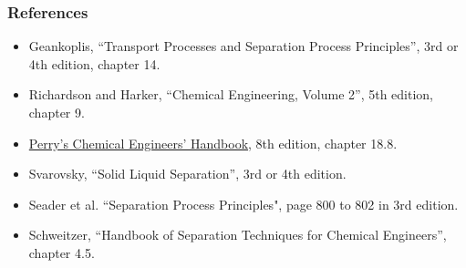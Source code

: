 




\begin{frame}\frametitle{References}
	\begin{itemize}
		\item	Geankoplis, ``Transport Processes and Separation Process Principles'', 3rd or 4th edition, chapter 14.
		\item	Richardson and Harker, ``Chemical Engineering, Volume 2'', 5th edition, chapter 9.
		\item	\href{http://accessengineeringlibrary.com/browse/perrys-chemical-engineers-handbook-eighth-edition}{Perry's Chemical Engineers' Handbook}, 8th edition, chapter 18.8.
		\item	Svarovsky, ``Solid Liquid Separation'', 3rd or 4th edition. %
		\item	Seader et al. ``Separation Process Principles", page 800 to 802 in 3rd edition.
		\item	Schweitzer, ``Handbook of Separation Techniques for Chemical Engineers'', chapter 4.5.
	\end{itemize}
\end{frame}

